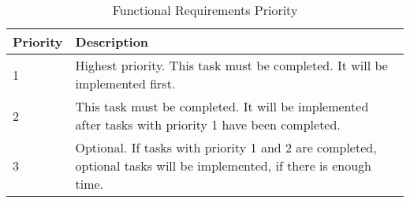 \begin{longtable}{|p{2cm}|X|}
\caption{\label{tab:useCasesFuncPrio}Functional Requirements Priority}\\
\hline
\textbf{Priority}	& \textbf{Description}\\
\hline
\hline
1									& Highest priority. This task must be completed. It will be implemented first.\\
\hline
2									& This task must be completed. It will be implemented after tasks with priority 1 have been completed.\\
\hline
3									& Optional. If tasks with priority 1 and 2 are completed, optional tasks will be implemented, if there is enough time.\\
\hline
\end{longtable}